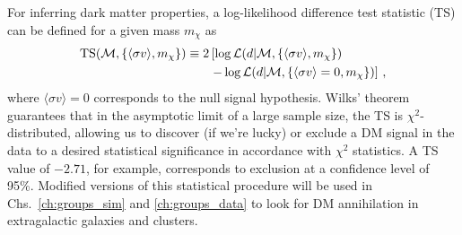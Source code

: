 For inferring dark matter properties, a log-likelihood difference test statistic (TS) can be defined for a given mass $m_\chi$ as
\begin{equation}\begin{aligned}
{\rm TS}(\mathcal{M}, \{ \langle\sigma v\rangle, m_\chi\}) \equiv 2 &\left[ \log \mathcal{L}(d | \mathcal{M}, \{\langle\sigma v\rangle, m_\chi \}) \right.\\
&\left.- \log \mathcal{L}(d | \mathcal{M}, \{{\langle\sigma v\rangle=0}, m_\chi \}) \right]\,,
\label{eq:TSdef_darksky}
\end{aligned}\end{equation}
where $\langle\sigma v\rangle=0$ corresponds to the null signal hypothesis. Wilks' theorem guarantees that in the asymptotic limit of a large sample size, the TS is $\chi^2$-distributed, allowing us to discover (if we're lucky) or exclude a DM signal in the data to a desired statistical significance in accordance with $\chi^2$ statistics. A TS value of $-2.71$, for example, corresponds to exclusion at a confidence level of 95\%. Modified versions of this statistical procedure will be used in Chs.~\ref{ch:groups_sim} and \ref{ch:groups_data} to look for DM annihilation in extragalactic galaxies and clusters.

